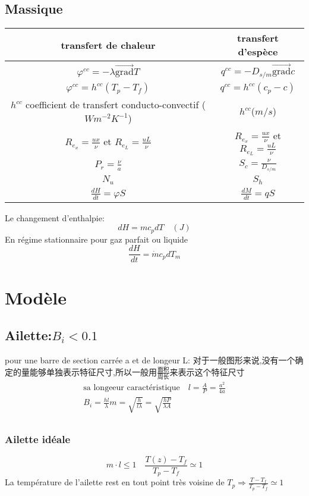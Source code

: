 \documentclass[openany]{book}
\begin{document}
\subsection{Massique}
\begin{tabular}{|c|c|}
\hline
transfert de chaleur & transfert d'esp\`ece \\
\hline
$\varphi^{cc}= - \lambda \vec{\mbox{grad}}T$ & $q^{cc}= - D_{s/m} \vec{\mbox{grad}}c $\\
\hline
$\varphi^{cc}=h^{cc}(T_p - T_f)$ & $q^{cc}=h^{cc}(c_p - c)$\\
\hline
$h^{cc}$ coefficient de transfert conducto-convectif ($Wm^{-2}K^{-1}$) & $h^{cc} $($m/s$) \\
\hline
$R_{e_x}=\frac{ux}{\nu}$ et $R_{e_L}=\frac{ uL}{\nu}$ & $R_{e_x}=\frac{ux}{\nu}$ et $R_{e_L}=\frac{ uL}{\nu}$ \\
\hline
$P_r=\frac{ \nu}{a} $& $S_c=\frac{\nu}{D_{s/m}} $\\
\hline
$N_u$ & $S_h $\\
\hline
$\frac{ dH}{dt}=\varphi S$ & $\frac{dM}{dt}=qS$\\
\hline
\end{tabular}

Le changement d'enthalpie: $$dH=m c_p dT \quad (J)$$
En r\'egime stationnaire pour gaz parfait ou liquide
$$\frac{ dH}{dt}=\dot{m}c_p dT_m$$


\section{Mod\`ele}
\subsection{Ailette:$B_i < 0.1$}
pour une barre de section carr\'ee a et de longeur L:
对于一般图形来说,没有一个确定的量能够单独表示特征尺寸,所以一般用$\frac{\text{面积}}{\text{周长}}$来表示这个特征尺寸
\begin{eqnarray}
\text{sa longeeur caract\'eristique}\quad l=\frac{A}{P}=\frac{a^2}{4a} \\
B_i = \frac{ hl}{\lambda }
m=\sqrt{\frac{ h}{l\lambda }}=\sqrt{\frac{ hP}{\lambda A}} \\
\end{eqnarray}
\subsubsection{Ailette id\'eale}
$$
m\cdot l \leq 1 \quad \frac{T(z)-T_f}{T_p - T_f} \simeq 1
$$
La temp\'erature de l'ailette rest en tout point tr\`es voisine de $T_p  \Rightarrow \frac{ T - T_f}{T_p - T_f}\simeq 1$
\end{document}

